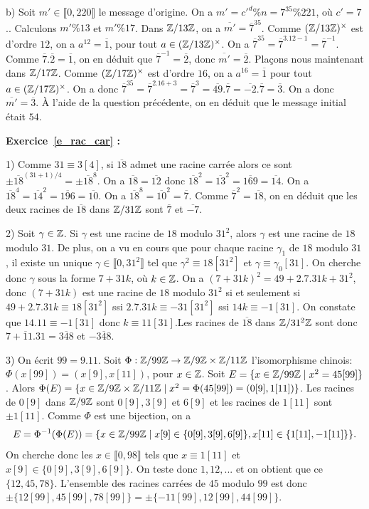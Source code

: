 \documentclass[11pt,a4paper]{article}
\begin{document}
b) Soit $m'\in \llbracket 0,220\rrbracket$ le message d'origine. On a $m'=c'^d\%n= 7^{35}\% 221$, où $c'=7$.. Calculons $m'\% 13$ et $m'\% 17$. Dans $\mathbb{Z}/13\mathbb{Z}$, on a $\overline{m'}=\overline{7}^{35}$. Comme $(\mathbb{Z}/13\mathbb{Z})^\times$ est d'ordre $12$, on a $a^12=\overline{1}$, pour tout $a\in (\mathbb{Z}/13\mathbb{Z})^\times$. On a  $\overline{7}^{35}=\overline{7}^{3.12-1}=\overline{7}^{-1}$. Comme $\overline{7}.\overline{2}=\overline{1}$, on en déduit que $\overline{7}^{-1}=\overline{2}$, donc $\overline{m'}=\overline{2}$. Plaçons nous maintenant dans $\mathbb{Z}/17\mathbb{Z}$. Comme $(\mathbb{Z}/17\mathbb{Z})^\times$ est d'ordre $16$, on a $a^{16}=\overline{1}$ pour tout $a\in (\mathbb{Z}/17\mathbb{Z})^\times$. On a donc $\overline{7}^{35}=\overline{7}^{2.16+3}=\overline{7}^{3}=\overline{49}.\overline{7}=\overline{-2}.\overline{7}=\overline{3}$. On a donc $\overline{m'}=\overline{3}$. À l'aide de la question précédente, on en déduit que le message initial était $54$. 

\textbf{Exercice~\ref{e_rac_car} :}

1) Comme $31\equiv 3[4]$, si $\overline{18}$ admet une racine carrée alors ce sont $\pm\overline{18}^{(31+1)/4}=\pm\overline{18}^{8}$. On a $\overline{18}=\overline{12}$ donc $\overline{18}^2=\overline{13}^2=\overline{169}=\overline{14}$. On a $\overline{18}^4=\overline{14}^2=\overline{196}=\overline{10}$. On a $\overline{18}^8=\overline{10}^2=\overline{7}$. Comme $\overline{7}^2=\overline{18}$, on en déduit que les deux racines de $\overline{18}$ dans $\mathbb{Z}/31\mathbb{Z}$ sont $\overline{7}$ et $\overline{-7}$. 

  2) Soit $\gamma\in \mathbb{Z}$. Si $\gamma$ est une racine de $18$ modulo $31^2$, alors $\gamma$ est une racine de $18$ modulo $31$. De plus, on a vu en cours que pour chaque racine $\gamma_1$ de $18$ modulo $31$, il existe un unique $\gamma\in \llbracket 0,31^2\rrbracket$ tel que $\gamma^2\equiv 18[31^2]$ et $\gamma\equiv\gamma_0[31]$. On cherche donc $\gamma$ sous la forme $7+31k$, où $k\in \mathbb{Z}$. On a $(7+31k)^2=49+2.7.31k+31^2$, donc $(7+31k)$ est une racine de $18$ modulo $31^2$ si et seulement si $49+2.7.31k\equiv 18[31^2]$ ssi $2.7.31k\equiv -31[31^2]$ ssi $14k \equiv -1[31]$. On constate que $14.11\equiv -1[31]$ donc $k\equiv 11[31]$.Les racines de $\overline{18}$ dans $\mathbb{Z}/31^2\mathbb{Z}$ sont donc $\overline{7+11.31}=\overline{348}$ et $-\overline{348}$.
  
  
  3) On écrit $99=9.11$. Soit $\Phi:\mathbb{Z}/99\mathbb{Z}\rightarrow \mathbb{Z}/9\mathbb{Z}\times \mathbb{Z}/11\mathbb{Z}$ l'isomorphisme chinois: $\Phi(x[99])=(x[9],x[11])$, pour $x\in \mathbb{Z}$. Soit $E=\{x\in \mathbb{Z}/99\mathbb{Z}\mid x^2=45[99]\}$. Alors $\Phi(E)=\{x\in \mathbb{Z}/9\mathbb{Z}\times \mathbb{Z}/11\mathbb{Z}\mid x^2=\Phi(45[99])=(0[9],1[11])\}$. Les racines de $0[9]$ dans $\mathbb{Z}/9\mathbb{Z}$ sont $0[9], 3[9]$ et $6[9]$ et les racines de $1[11]$ sont $\pm 1[11]$. Comme $\Phi$ est une bijection, on a  \[E=\Phi^{-1}(\Phi(E))=\{x\in \mathbb{Z}/99\mathbb{Z}\mid x[9]\in \{0[9],3[9],6[9]\}, x[11]\in \{1[11],-1[11]\}\}.\] On cherche donc les $x\in \llbracket 0,98\rrbracket$ tels que $x\equiv 1[11]$ et $x[9]\in \{0[9],3[9],6[9]\}$. On teste donc $1, 12, ...$ et on obtient que ce $\{12,45,78\}$. L'ensemble des racines carrées de $45$ modulo $99$ est donc $\pm\{12[99],45[99],78[99]\}=\pm\{-11[99],12[99],44[99]\}$. 
\end{document}
